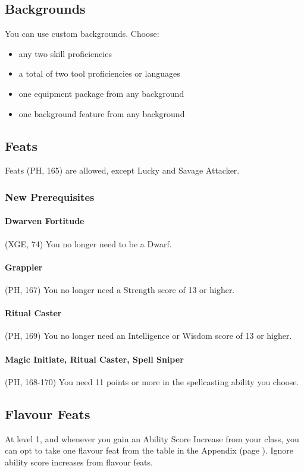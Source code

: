 \documentclass[letterpaper,twocolumn,openany,nodeprecatedcode,bg=print]{dndbook}
\newcommand{\pg}[1]{page \pageref{#1}}
\begin{document}
\subsection{Backgrounds}
You can use custom backgrounds. Choose:
\begin{itemize}
\item any two skill proficiencies 
\item a total of two tool proficiencies or languages 
\item one equipment package from any background
\item one background feature from any background
\end{itemize}

\subsection{Feats}
Feats (PH, 165) are allowed, except Lucky and Savage Attacker.

\subsubsection{New Prerequisites}

\paragraph{Dwarven Fortitude} (XGE, 74) You no longer need to be a Dwarf.

\paragraph{Grappler} (PH, 167) You no longer need a Strength score of 13 or higher.

\paragraph{Ritual Caster} (PH, 169) You no longer need an Intelligence or Wisdom score of 13 or higher.

\paragraph{Magic Initiate, Ritual Caster, Spell Sniper} (PH, 168-170) You need 11 points or more in the spellcasting ability you choose.

\subsection{Flavour Feats}
\label{flavour-feats}
At level 1, and whenever you gain an Ability Score Increase from your class, you can opt to take one flavour feat from the table in the Appendix (\pg{flavour-feats-table}). Ignore ability score increases from flavour feats.
\end{document}
